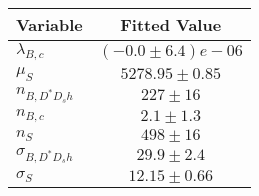 \begin{tabular}[t]{lc}
\hline
Variable &Fitted Value\\
\hline\hline
$\lambda_{B,c}$&$(-0.0\pm6.4)e-06$\\
\hline
$\mu_S$&$5278.95\pm0.85$\\
\hline
$n_{B, D^* D_s h}$&$227\pm16$\\
\hline
$n_{B,c}$&$2.1\pm1.3$\\
\hline
$n_S$&$498\pm16$\\
\hline
$\sigma_{B, D^* D_s h}$&$29.9\pm2.4$\\
\hline
$\sigma_S$&$12.15\pm0.66$\\
\hline
\end{tabular}